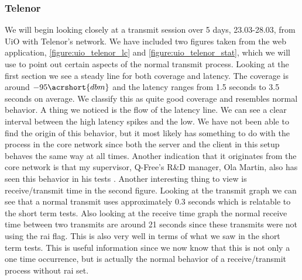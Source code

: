 \documentclass[USenglish]{ifimaster}  %
\begin{document}
\subsubsection{Telenor}
We will begin looking closely at a transmit session over 5 days, 23.03-28.03, from UiO with Telenor's network. We have included two figures taken from the web application, \vref{figure:uio_telenor_lc} and \vref{figure:uio_telenor_stat}, which we will use to point out certain aspects of the normal transmit process. Looking at the first section we see a steady line for both coverage and latency. The coverage is around ${-95 \acrshort{dbm}}$ and the latency ranges from 1.5 seconds to 3.5 seconds on average. We classify this as quite good coverage and resembles normal behavior. A thing we noticed is the flow of the latency line. We can see a clear interval between the high latency spikes and the low. We have not been able to find the origin of this behavior, but it most likely has something to do with the process in the core network since both the server and the client in this setup behaves the same way at all times. Another indication that it originates from the core network is that my supervisor, Q-Free's R\&D manager, Ola Martin, also has seen this behavior in his tests \cite{person:ola}. Another interesting thing to view is receive/transmit time in the second figure. Looking at the transmit graph we can see that a normal transmit uses approximately 0.3 seconds which is relatable to the short term tests. Also looking at the receive time graph the normal receive time between two transmits are around 21 seconds since these transmits were not using the \acrshort{rai} flag. This is also very well in terms of what we saw in the short term tests. This is useful information since we now know that this is not only a one time occurrence, but is actually the normal behavior of a receive/transmit process without \acrshort{rai} set.
\end{document}
